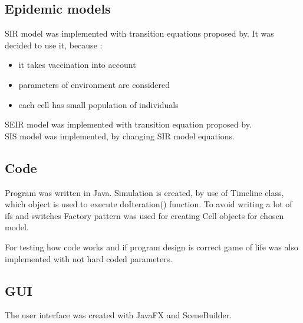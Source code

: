\documentclass[a4paper, 11pt]{article}
\begin{document}
\subsection{Epidemic models}

SIR model was implemented with transition equations proposed by\cite{WHITE}. It was decided to use it, because :\\
\begin{itemize}
\item it takes vaccination into account
\item parameters of environment are considered
\item each cell has small population of individuals
\end{itemize}

\noindent SEIR model was implemented with transition equation proposed by\cite{cisse}.\\

\noindent SIS model was implemented, by changing SIR model equations.\\



\subsection{Code}
Program was written in Java. Simulation is created, by use of Timeline class, which object is used to execute doIteration() function. To avoid writing a lot of ifs and switches Factory pattern was used for creating Cell objects for chosen model.
%


For testing how code works and if program design is correct game of life was also implemented with not hard coded parameters.

\subsection{GUI}
The user interface was created with JavaFX and SceneBuilder.\\
\end{document}
